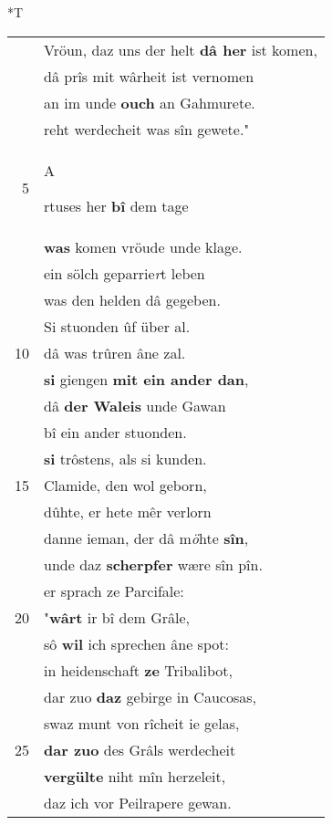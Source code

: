\documentclass[8pt,a4paper,notitlepage]{article}
\begin{document}
\begin{table}[ht]
\begin{minipage}[t]{0.5\linewidth}
\end{minipage}
\hspace{0.5cm}
\begin{minipage}[t]{0.5\linewidth}
\small
\begin{center}*T
\end{center}
\begin{tabular}{rl}
 & Vröun, daz uns der helt \textbf{dâ her} ist komen,\\ 
 & dâ prîs mit wârheit ist vernomen\\ 
 & an im unde \textbf{ouch} an Gahmurete.\\ 
 & reht werdecheit was sîn gewete."\\ 
5 & \begin{large}A\end{large}rtuses her \textbf{bî} dem tage\\ 
 & \textbf{was} komen vröude unde klage.\\ 
 & ein sölch geparrie\textit{r}t leben\\ 
 & was den helden dâ gegeben.\\ 
 & Si stuonden ûf über al.\\ 
10 & dâ was trûren âne zal.\\ 
 & \textbf{si} giengen \textbf{mit ein ander dan},\\ 
 & dâ \textbf{der Waleis} unde Gawan\\ 
 & bî ein ander stuonden.\\ 
 & \textbf{si} trôstens, als si kunden.\\ 
15 & Clamide, den wol geborn,\\ 
 & dûhte, er hete mêr verlorn\\ 
 & danne ieman, der dâ m\textit{ö}hte \textbf{sîn},\\ 
 & unde daz \textbf{scherpfer} wære sîn pîn.\\ 
 & er sprach ze Parcifale:\\ 
20 & "\textbf{wârt} ir bî dem Grâle,\\ 
 & sô \textbf{wil} ich sprechen âne spot:\\ 
 & in heidenschaft \textbf{ze} Tribalibot,\\ 
 & dar zuo \textbf{daz} gebirge in Caucosas,\\ 
 & swaz munt von rîcheit ie gelas,\\ 
25 & \textbf{dar zuo} des Grâls werdecheit\\ 
 & \textbf{vergülte} niht mîn herzeleit,\\ 
 & daz ich vor Peilrapere gewan.\\ 

\end{tabular}
\end{minipage}
\end{table}
\end{document}
